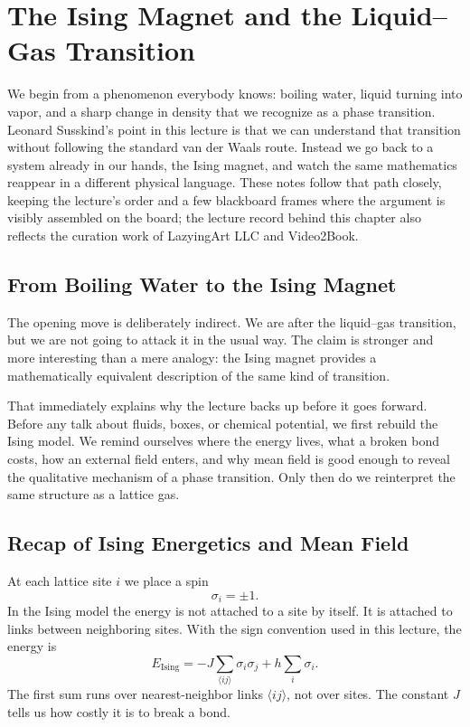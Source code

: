 \chapter{The Ising Magnet and the Liquid--Gas Transition}

We begin from a phenomenon everybody knows: boiling water, liquid turning into vapor, and a sharp change in density that we recognize as a phase transition. Leonard Susskind's point in this lecture is that we can understand that transition without following the standard van der Waals route. Instead we go back to a system already in our hands, the Ising magnet, and watch the same mathematics reappear in a different physical language. These notes follow that path closely, keeping the lecture's order and a few blackboard frames where the argument is visibly assembled on the board; the lecture record behind this chapter also reflects the curation work of LazyingArt LLC and Video2Book.

\section{From Boiling Water to the Ising Magnet}

The opening move is deliberately indirect. We are after the liquid--gas transition, but we are not going to attack it in the usual way. The claim is stronger and more interesting than a mere analogy: the Ising magnet provides a mathematically equivalent description of the same kind of transition.

That immediately explains why the lecture backs up before it goes forward. Before any talk about fluids, boxes, or chemical potential, we first rebuild the Ising model. We remind ourselves where the energy lives, what a broken bond costs, how an external field enters, and why mean field is good enough to reveal the qualitative mechanism of a phase transition. Only then do we reinterpret the same structure as a lattice gas.

\section{Recap of Ising Energetics and Mean Field}

At each lattice site \(i\) we place a spin
\begin{equation}
\sigma_i=\pm 1.
\end{equation}
In the Ising model the energy is not attached to a site by itself. It is attached to links between neighboring sites. With the sign convention used in this lecture, the energy is
\begin{equation}
E_{\text{Ising}}=-J\sum_{\langle ij\rangle}\sigma_i\sigma_j+h\sum_i \sigma_i.
\end{equation}
The first sum runs over nearest-neighbor links \(\langle ij\rangle\), not over sites. The constant \(J\) tells us how costly it is to break a bond.

